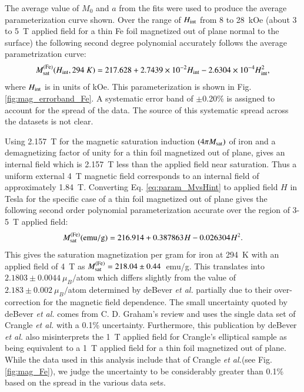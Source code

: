 \documentclass[preprint,12pt]{elsarticle}
\begin{document}
The average value of $M_0$ and $a$ from the fits were used to produce the average parameterization curve shown. Over the range of $H_{\rm int}$ from 8 to 28~kOe (about 3 to 5~T applied field for a thin Fe foil magnetized out of plane normal to the surface) the following second degree polynomial accurately follows the average parametrization curve: 
\begin{equation}
\label{eq:param_MvsHint}
M_{\rm sat}^{\rm (Fe)}(H_{\rm int},294~K)=217.628+2.7439\times10^{-2}H_{\rm int}-2.6304\times10^{-4}H_{\rm int}^2,
\end{equation}
where $H_{\rm int}$ is in units of kOe. This parameterization is shown in Fig.\ref{fig:mag_errorband_Fe}. A systematic error band of $\pm$0.20\% is assigned to account for the spread of the data. The source of this systematic spread across the datasets is not clear. 

Using 2.157~T for the magnetic saturation induction $(4\pi M_{\rm sat})$ of iron and a demagnetizing factor of unity for a thin foil magnetized out of plane, gives an internal field which is 2.157~T less than the applied field near saturation. Thus a uniform external 4~T magnetic field corresponds to an internal field of approximately 1.84~T. Converting Eq. \ref{eq:param_MvsHint} to applied field $H$ in Tesla for the specific case of a thin foil magnetized out of plane gives the following second order polynomial parameterization accurate over the region of 3-5~T applied field:
\begin{equation}
M_{\rm sat}^{\rm(Fe)}({\rm emu/g})=216.914+0.387863\hspace{.06667em}H-0.026304\hspace{.06667em}H^2.
\end{equation}
This gives the saturation magnetization per gram for iron at 294~K with an applied field of 4~T as $M_{\rm sat}^{\rm (Fe)}=218.04\pm0.44$~emu/g. This translates into $2.1803\pm0.0044~\mu_B/$atom which differs slightly from the value of $2.183\pm0.002~\mu_B/$atom determined by deBever {\it et al.}\cite{deBever1997} partially due to their over-correction for the magnetic field dependence. The small uncertainty quoted by  deBever {\it et al.} comes from C. D. Graham's review \cite{Graham1982} and uses the single data set of Crangle {\it et al.}\cite{Crangle1971} with a 0.1\% uncertainty. Furthermore, this publication by deBever {\it et al.} also misinterprets the 1~T applied field for Crangle's elliptical sample as being equivalent to a 1~T applied field for a thin foil magnetized out of plane.  While the data used in this analysis include that of Crangle {\it et al.}(see Fig. \ref{fig:mag_Fe}), we judge the uncertainty to be considerably greater than 0.1\% based on the spread in the various data sets. 
\end{document}
